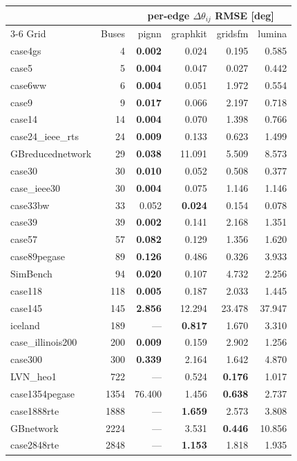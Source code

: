 \documentclass[10pt]{article}
\begin{document}
\begin{longtable}{lrrrrr}
\toprule
& & \multicolumn{4}{c}{per-edge $\Delta\theta_{ij}$ RMSE [deg]} \\
\cmidrule(lr){3-6}
Grid & Buses & pignn & graphkit & gridsfm & lumina \\
\midrule
\endhead
case4gs & 4 & \textbf{0.002} & 0.024 & 0.195 & 0.585 \\
case5 & 5 & \textbf{0.004} & 0.047 & 0.027 & 0.442 \\
case6ww & 6 & \textbf{0.004} & 0.051 & 1.972 & 0.554 \\
case9 & 9 & \textbf{0.017} & 0.066 & 2.197 & 0.718 \\
case14 & 14 & \textbf{0.004} & 0.070 & 1.398 & 0.766 \\
case24\_ieee\_rts & 24 & \textbf{0.009} & 0.133 & 0.623 & 1.499 \\
GBreducednetwork & 29 & \textbf{0.038} & 11.091 & 5.509 & 8.573 \\
case30 & 30 & \textbf{0.010} & 0.052 & 0.508 & 0.377 \\
case\_ieee30 & 30 & \textbf{0.004} & 0.075 & 1.146 & 1.146 \\
case33bw & 33 & 0.052 & \textbf{0.024} & 0.154 & 0.078 \\
case39 & 39 & \textbf{0.002} & 0.141 & 2.168 & 1.351 \\
case57 & 57 & \textbf{0.082} & 0.129 & 1.356 & 1.620 \\
case89pegase & 89 & \textbf{0.126} & 0.486 & 0.326 & 3.933 \\
SimBench & 94 & \textbf{0.020} & 0.107 & 4.732 & 2.256 \\
case118 & 118 & \textbf{0.005} & 0.187 & 2.033 & 1.445 \\
case145 & 145 & \textbf{2.856} & 12.294 & 23.478 & 37.947 \\
iceland & 189 & --- & \textbf{0.817} & 1.670 & 3.310 \\
case\_illinois200 & 200 & \textbf{0.009} & 0.159 & 2.902 & 1.256 \\
case300 & 300 & \textbf{0.339} & 2.164 & 1.642 & 4.870 \\
LVN\_heo1 & 722 & --- & 0.524 & \textbf{0.176} & 1.017 \\
case1354pegase & 1354 & 76.400 & 1.456 & \textbf{0.638} & 2.737 \\
case1888rte & 1888 & --- & \textbf{1.659} & 2.573 & 3.808 \\
GBnetwork & 2224 & --- & 3.531 & \textbf{0.446} & 10.856 \\
case2848rte & 2848 & --- & \textbf{1.153} & 1.818 & 1.935 \\

\end{longtable}
\end{document}
